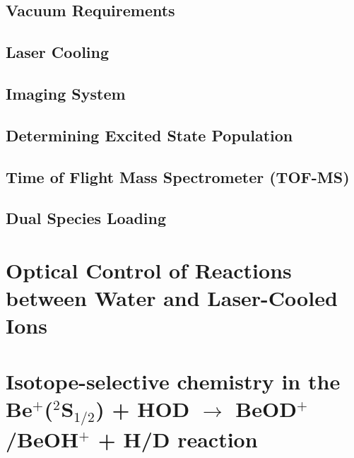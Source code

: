 \documentclass [PhD,nolistoftables,scheader] {uclathes}
\begin{document}
	\section{Vacuum Requirements}
	
	
	\section{ Laser Cooling}
	
	
	\section{Imaging System}
	
	
	\section{Determining Excited State Population}
	

	\section{Time of Flight Mass Spectrometer (TOF-MS)} \label{sec: TOF}
	
	
	\section{Dual Species Loading} \label{sec: dual loading}
	

\chapter{Optical Control of Reactions between Water and Laser-Cooled  Ions} \label{sec: Be+H2O}


\chapter{Isotope-selective chemistry in the Be$^+$($^2$S$_{1/2}$) + HOD $\rightarrow$ BeOD$^+$/BeOH$^+$ + H/D reaction}


\end{document}
